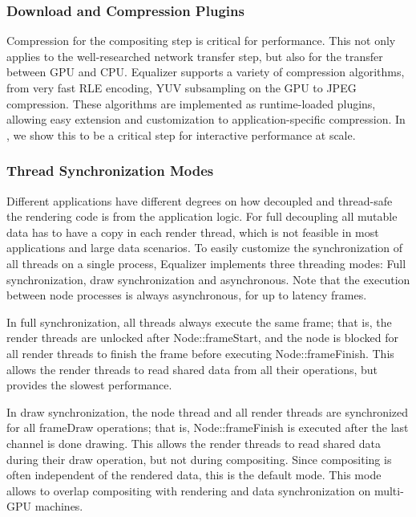 \documentclass[10pt,journal,compsoc]{IEEEtran}
\begin{document}
\subsubsection{Download and Compression Plugins}

Compression for the compositing step is critical for performance. This not only
applies to the well-researched network transfer step, but also for the transfer
between GPU and CPU. \textsf{Equalizer} supports a variety of compression
algorithms, from very fast RLE encoding, YUV subsampling on the GPU to JPEG
compression. These algorithms are implemented as runtime-loaded plugins,
allowing easy extension and customization to application-specific compression.
In \cite{MEP:10}, we show this to be a critical step for interactive performance
at scale.

\subsubsection{Thread Synchronization Modes}\label{sec:threading}

Different applications have different degrees on how decoupled and thread-safe
the rendering code is from the application logic. For full decoupling all
mutable data has to have a copy in each render thread, which is not feasible in
most applications and large data scenarios. To easily customize the
synchronization of all threads on a single process, \textsf{Equalizer}
implements three threading modes:  Full synchronization, draw synchronization
and asynchronous. Note that the execution between node processes is always
asynchronous, for up to \textsf{latency} frames.

In full synchronization, all threads always execute the same frame; that is, the
render threads are unlocked after \textsf{Node::frameStart}, and the node is
blocked for all render threads to finish the frame before executing
\textsf{Node::frameFinish}. This allows the render threads to read shared data
from all their operations, but provides the slowest performance.

In draw synchronization, the node thread and all render threads are synchronized
for all \textsf{frameDraw} operations; that is, \textsf{Node::frameFinish} is
executed after the last channel is done drawing. This allows the render threads
to read shared data during their draw operation, but not during compositing.
Since compositing is often independent of the rendered data, this is the default
mode. This mode allows to overlap compositing with rendering and data
synchronization on multi-GPU machines.
\end{document}
